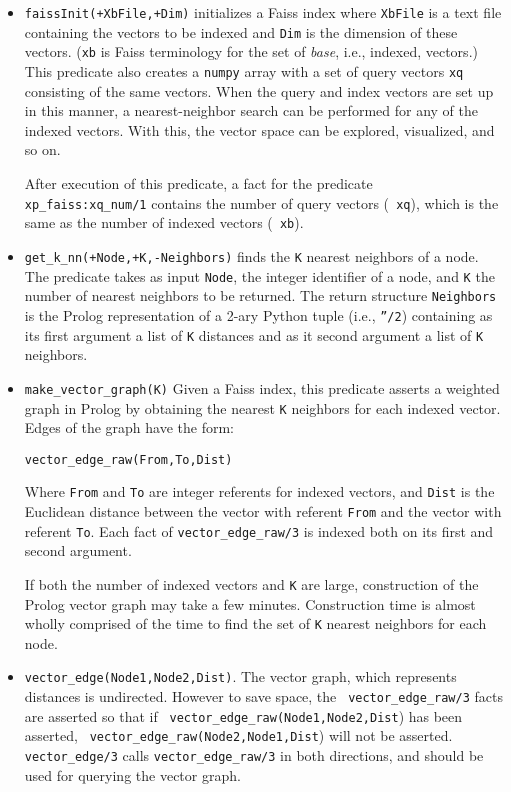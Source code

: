 \begin{itemize}
\item {\tt faissInit(+XbFile,+Dim)} initializes a Faiss index where
  {\tt XbFile} is a text file containing the vectors to be indexed and
  {\tt Dim} is the dimension of these vectors. ({\tt xb} is Faiss
  terminology for the set of {\em base}, i.e., indexed, vectors.)
  This predicate also creates a {\tt numpy} array with a set of query
  vectors {\tt xq} consisting of the same vectors.  When the query and
  index vectors are set up in this manner, a nearest-neighbor search
  can be performed for any of the indexed vectors.  With this, the
  vector space can be explored, visualized, and so on.

  After execution of this predicate, a fact for the predicate {\tt
    xp\_faiss:xq\_num/1} contains the number of query vectors ({\tt
    xq}), which is the same as the number of indexed vectors ({\tt
    xb}).

\item {\tt get\_k\_nn(+Node,+K,-Neighbors)} finds the {\tt K} nearest
  neighbors of a node.  The predicate takes as input {\tt Node}, the
  integer identifier of a node, and {\tt K} the number of nearest
  neighbors to be returned.  The return structure {\tt Neighbors} is
  the Prolog representation of a 2-ary Python tuple (i.e., {\tt ''/2})
  containing as its first argument a list of {\tt K} distances and as
  it second argument a list of {\tt K} neighbors.


\item {\tt make\_vector\_graph(K)} Given a Faiss index, this predicate
  asserts a weighted graph in Prolog by obtaining the nearest {\tt K}
  neighbors for each indexed vector.  Edges of the graph have the form:

  {\tt vector\_edge\_raw(From,To,Dist)}

  \noindent
  Where {\tt From} and {\tt To} are integer referents for indexed
  vectors, and {\tt Dist} is the Euclidean distance between the vector
  with referent {\tt From} and the vector with referent {\tt To}.
  Each fact of {\tt vector\_edge\_raw/3} is indexed both on its first
  and second argument.

  If both the number of indexed vectors and {\tt K} are large,
  construction of the Prolog vector graph may take a few minutes.
  Construction time is almost wholly comprised of the time to find the
  set of {\tt K} nearest neighbors for each node.

\item {\tt vector\_edge(Node1,Node2,Dist)}.  The vector graph, which
  represents distances is undirected.  However to save space, the {\tt
    vector\_edge\_raw/3} facts are asserted so that if {\tt
    vector\_edge\_raw(Node1,Node2,Dist}) has been asserted, {\tt
    vector\_edge\_raw(Node2,Node1,Dist}) will not be asserted.  {\tt
    vector\_edge/3} calls {\tt vector\_edge\_raw/3} in both
  directions, and should be used for querying the vector graph.
  

\end{itemize}

